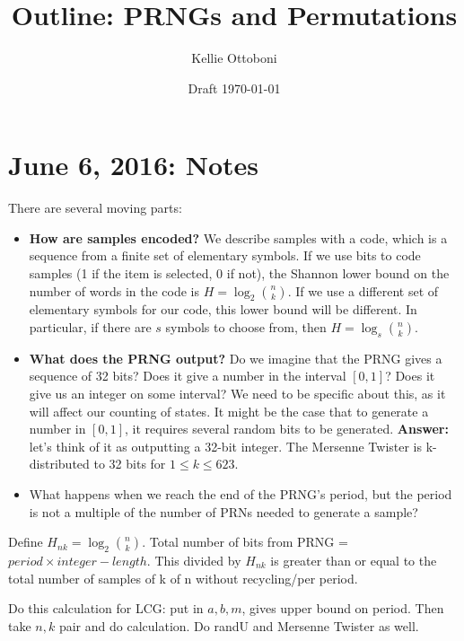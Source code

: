 \documentclass[12pt]{article}
\title{Outline: PRNGs and Permutations}
\author{Kellie Ottoboni}
\date{Draft \today}
\begin{document}
\maketitle






\section{June 6, 2016: Notes}
There are several moving parts:
\begin{itemize}
\item \textbf{How are samples encoded?} 
We describe samples with a code, which is a sequence from a finite set of elementary symbols.
If we use bits to code samples (1 if the item is selected, 0 if not), the Shannon lower bound on the number
of words in the code is $H = \log_2 {n \choose k}$.
If we use a different set of elementary symbols for our code, this lower bound will be different.
In particular, if there are $s$ symbols to choose from, then $H = \log_s {n \choose k}$.
\item \textbf{What does the PRNG output?}
Do we imagine that the PRNG gives a sequence of 32 bits?
Does it give a number in the interval $[0, 1]$?
Does it give us an integer on some interval?
We need to be specific about this, as it will affect our counting of states.
It might be the case that to generate a number in $[0, 1]$, it requires several random bits to be generated.
\textbf{Answer:} let's think of it as outputting a 32-bit integer.
The Mersenne Twister is k-distributed to 32 bits for $1 \leq k \leq 623$.
\item What happens when we reach the end of the PRNG's period, 
but the period is not a multiple of the number of PRNs needed to generate a sample?
\end{itemize}

Define $H_{nk} = \log_2 {n \choose k}$.
Total number of bits from PRNG = $period \times integer-length$. 
This divided by $H_{nk}$ is greater than or equal to the total number of samples of k of n without recycling/per period.


Do this calculation for LCG: put in $a, b, m$, gives upper bound on period.
Then take $n, k$ pair and do calculation.
Do randU and Mersenne Twister as well.
\end{document}
